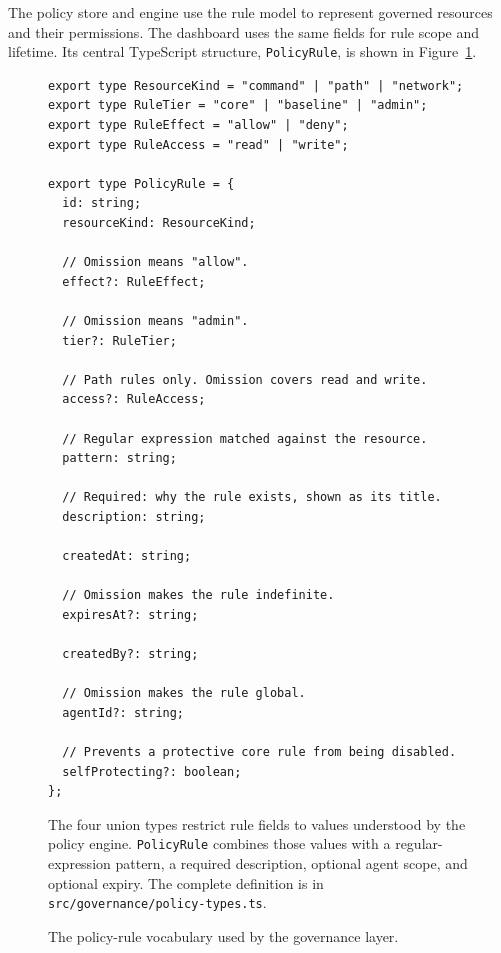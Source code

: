 {\color{red}The policy store and engine use the rule model to represent governed
resources and their permissions. The dashboard uses the same fields for rule
scope and lifetime. Its central TypeScript
structure, \texttt{PolicyRule}, is shown in
Figure~\ref{fig:gov-code-rule-model}.}

\begin{figure}[htbp]
\centering
\begin{minipage}{0.96\textwidth}
\begin{reportcodebox}
\begin{lstlisting}[style=reportcode]
export type ResourceKind = "command" | "path" | "network";
export type RuleTier = "core" | "baseline" | "admin";
export type RuleEffect = "allow" | "deny";
export type RuleAccess = "read" | "write";

export type PolicyRule = {
  id: string;
  resourceKind: ResourceKind;

  // Omission means "allow".
  effect?: RuleEffect;

  // Omission means "admin".
  tier?: RuleTier;

  // Path rules only. Omission covers read and write.
  access?: RuleAccess;

  // Regular expression matched against the resource.
  pattern: string;

  // Required: why the rule exists, shown as its title.
  description: string;

  createdAt: string;

  // Omission makes the rule indefinite.
  expiresAt?: string;

  createdBy?: string;

  // Omission makes the rule global.
  agentId?: string;

  // Prevents a protective core rule from being disabled.
  selfProtecting?: boolean;
};
\end{lstlisting}
\end{reportcodebox}
\end{minipage}
\caption{The policy-rule vocabulary used by the governance layer.}
\label{fig:gov-code-rule-model}
\vspace{0.6em}
\begin{minipage}{0.96\textwidth}
{\small
The four union types restrict rule fields to values understood by the policy
engine. \texttt{PolicyRule} combines those values with a regular-expression
pattern, a required description, optional agent scope, and optional expiry. The
complete definition is in \texttt{src/governance/policy-types.ts}.\par}
\end{minipage}
\end{figure}

